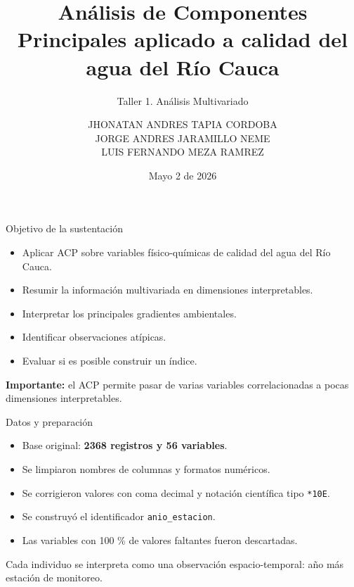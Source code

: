 \documentclass[aspectratio=169,11pt]{beamer}
\title[ACP calidad del agua]{Análisis de Componentes Principales aplicado a calidad del agua del Río Cauca}
\subtitle{Taller 1. Análisis Multivariado}
\author[J. Tapia, J. Jaramillo, L. Meza]{
JHONATAN ANDRES TAPIA CORDOBA\\
JORGE ANDRES JARAMILLO NEME\\
LUIS FERNANDO MEZA RAMREZ
}
\institute{Maestría en Inteligencia Artificial y Ciencia de Datos}
\date{Mayo 2 de 2026}
\begin{document}
\begin{frame}
  \titlepage
\end{frame}

\begin{frame}{Objetivo de la sustentación}
  \begin{itemize}
    \item Aplicar ACP sobre variables físico-químicas de calidad del agua del Río Cauca.
    \item Resumir la información multivariada en dimensiones interpretables.
    \item Interpretar los principales gradientes ambientales.
    \item Identificar observaciones atípicas.
    \item Evaluar si es posible construir un índice.
  \end{itemize}

  \vspace{0.3cm}
  \textbf{Importante:} el ACP permite pasar de varias variables correlacionadas a pocas dimensiones interpretables.
\end{frame}

\begin{frame}{Datos y preparación}
  \begin{itemize}
    \item Base original: \textbf{2368 registros y 56 variables}.
    \item Se limpiaron nombres de columnas y formatos numéricos.
    \item Se corrigieron valores con coma decimal y notación científica tipo \texttt{*10E}.
    \item Se construyó el identificador \texttt{anio\_estacion}.
    \item Las variables con 100 \% de valores faltantes fueron descartadas.
  \end{itemize}

  \vspace{0.25cm}
  Cada individuo se interpreta como una observación espacio-temporal: año más estación de monitoreo.
\end{frame}
\end{document}
